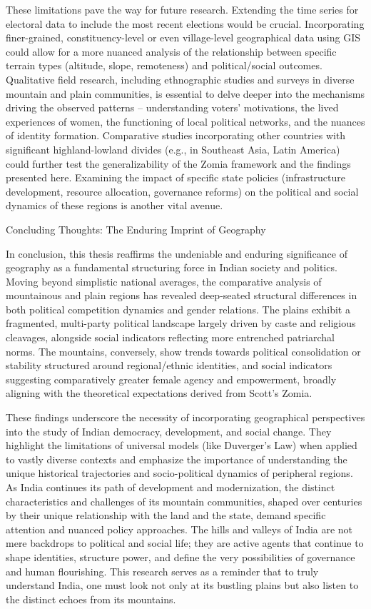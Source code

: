 These limitations pave the way for future research. Extending the time series for electoral data to include the most recent elections would be crucial. Incorporating finer-grained, constituency-level or even village-level geographical data using GIS could allow for a more nuanced analysis of the relationship between specific terrain types (altitude, slope, remoteness) and political/social outcomes. Qualitative field research, including ethnographic studies and surveys in diverse mountain and plain communities, is essential to delve deeper into the mechanisms driving the observed patterns – understanding voters' motivations, the lived experiences of women, the functioning of local political networks, and the nuances of identity formation. Comparative studies incorporating other countries with significant highland-lowland divides (e.g., in Southeast Asia, Latin America) could further test the generalizability of the Zomia framework and the findings presented here. Examining the impact of specific state policies (infrastructure development, resource allocation, governance reforms) on the political and social dynamics of these regions is another vital avenue.

Concluding Thoughts: The Enduring Imprint of Geography

In conclusion, this thesis reaffirms the undeniable and enduring significance of geography as a fundamental structuring force in Indian society and politics. Moving beyond simplistic national averages, the comparative analysis of mountainous and plain regions has revealed deep-seated structural differences in both political competition dynamics and gender relations. The plains exhibit a fragmented, multi-party political landscape largely driven by caste and religious cleavages, alongside social indicators reflecting more entrenched patriarchal norms. The mountains, conversely, show trends towards political consolidation or stability structured around regional/ethnic identities, and social indicators suggesting comparatively greater female agency and empowerment, broadly aligning with the theoretical expectations derived from Scott's Zomia.

These findings underscore the necessity of incorporating geographical perspectives into the study of Indian democracy, development, and social change. They highlight the limitations of universal models (like Duverger's Law) when applied to vastly diverse contexts and emphasize the importance of understanding the unique historical trajectories and socio-political dynamics of peripheral regions. As India continues its path of development and modernization, the distinct characteristics and challenges of its mountain communities, shaped over centuries by their unique relationship with the land and the state, demand specific attention and nuanced policy approaches. The hills and valleys of India are not mere backdrops to political and social life; they are active agents that continue to shape identities, structure power, and define the very possibilities of governance and human flourishing. This research serves as a reminder that to truly understand India, one must look not only at its bustling plains but also listen to the distinct echoes from its mountains.